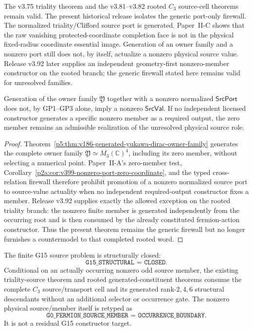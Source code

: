\documentclass[12pt,a4paper]{article}
\begin{document}
The v3.75 triality theorem and the v3.81--v3.82 rooted $C_3$ source-cell
theorems remain valid.  The present historical release isolates the generic
port-only firewall.  The normalized triality/Clifford source port is generated.
Paper~II-C shows that the raw vanishing protected-coordinate completion face
is not in the physical fixed-radius coordinate essential image.  Generation of
an owner family and a nonzero port still does not, by itself, actualize a
nonzero physical source value.  Release v3.92 later supplies an independent
geometry-first nonzero-member constructor on the rooted branch; the generic
firewall stated here remains valid for unresolved families.

\begin{theorem}
\label{p5:thm:v385-fermion-source-zero-branch}
Generation of the owner family $\mathfrak Y$ together with a nonzero normalized
$\mathsf{SrcPort}$ does not, by GP1--GP3 alone, imply a nonzero
$\mathsf{SrcVal}$.  If no independent licensed constructor generates a
specific nonzero member as a required output, the zero member remains an
admissible realization of the unresolved physical source role.
\end{theorem}

\begin{proof}
Theorem~\ref{p5:thm:v186-generated-yukawa-dirac-owner-family} generates
the complete owner family $\mathfrak Y\simeq M_3(\mathbb C)^4$, including
its zero member, without selecting a numerical point.  Paper~II-A's
zero-member test, Corollary~\ref{p2a:cor:v399-nonzero-port-zero-coordinate},
and the typed cross-relation firewall therefore prohibit promotion of a
nonzero normalized source port to source-value actuality when no independent
required-output constructor fixes a member.  Release v3.92 supplies exactly
the allowed exception on the rooted triality branch: the nonzero finite member
is generated independently from the occurring root and is then consumed by
the already constituted fermion-action constructor.  Thus the present theorem
remains the generic firewall but no longer furnishes a countermodel to that
completed rooted word.
\end{proof}

\begin{corollary}
\label{p5:cor:v385-g15-structural-retirement}
The finite G15 source problem is structurally closed:
\[
 \boxed{\texttt{G15\_STRUCTURAL = CLOSED}.}
\]
Conditional on an actually occurring nonzero odd source member, the existing
triality-source theorem and rooted generated-constituent theorems consume the
complete $C_3$ source/transport cell and its generated rank-$2,4,6$ structural
descendants without an additional selector or occurrence gate.  The nonzero
physical source/member itself is retyped as
\[
 \boxed{\texttt{G0\_FERMION\_SOURCE\_MEMBER = OCCURRENCE\_BOUNDARY}.}
\]
It is not a residual G15 constructor target.
\end{corollary}
\end{document}

